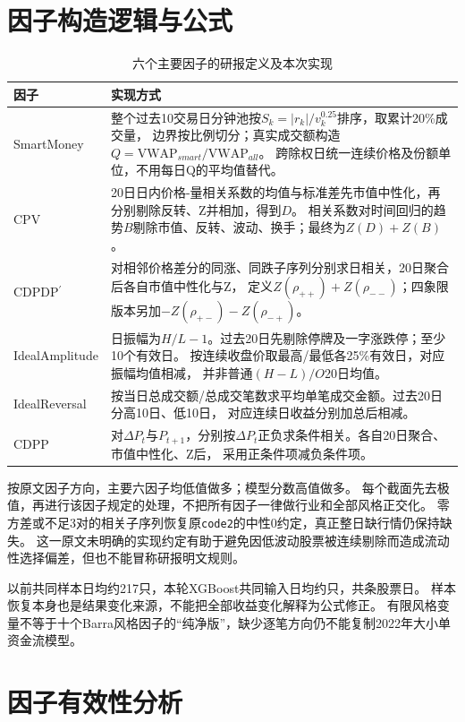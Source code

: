 \documentclass[UTF8,zihao=-4,fontset=fandol]{ctexart}
\begin{document}
\section{因子构造逻辑与公式}
\begin{table}[H]\centering\small
\caption{六个主要因子的研报定义及本次实现}
\begin{tabularx}{\linewidth}{p{28mm}X}\toprule
因子 & 实现方式\\\midrule
SmartMoney & 整个过去10交易日分钟池按$S_k=|r_k|/v_k^{0.25}$排序，取累计20\%成交量，
边界按比例切分；真实成交额构造$Q=\mathrm{VWAP}_{smart}/\mathrm{VWAP}_{all}$。
跨除权日统一连续价格及份额单位，不用每日Q的平均值替代。\\[2pt]
CPV & 20日日内价格-量相关系数的均值与标准差先市值中性化，再分别剔除反转、Z并相加，得到$D$。
相关系数对时间回归的趋势$B$剔除市值、反转、波动、换手；最终为$Z(D)+Z(B)$。\\[2pt]
CDPDP$^{\prime}$ & 对相邻价格差分的同涨、同跌子序列分别求日相关，20日聚合后各自市值中性化与Z，
定义$Z(\rho_{++})+Z(\rho_{--})$；四象限版本另加$-Z(\rho_{+-})-Z(\rho_{-+})$。\\[2pt]
IdealAmplitude & 日振幅为$H/L-1$。过去20日先剔除停牌及一字涨跌停；至少10个有效日。
按连续收盘价取最高/最低各25\%有效日，对应振幅均值相减，
并非普通$(H-L)/O$20日均值。\\[2pt]
IdealReversal & 按当日总成交额/总成交笔数求平均单笔成交金额。过去20日分高10日、低10日，
对应连续日收益分别加总后相减。\\[2pt]
CDPP & 对$\Delta P_t$与$P_{t+1}$，分别按$\Delta P_t$正负求条件相关。各自20日聚合、市值中性化、Z后，
采用正条件项减负条件项。\\\bottomrule
\end{tabularx}\end{table}

按原文因子方向，主要六因子均低值做多；模型分数高值做多。
每个截面先去极值，再进行该因子规定的处理，不把所有因子一律做行业和全部风格正交化。
零方差或不足3对的相关子序列恢复原\texttt{code2}的中性0约定，真正整日缺行情仍保持缺失。
这一原文未明确的实现约定有助于避免因低波动股票被连续剔除而造成流动性选择偏差，但也不能冒称研报明文规则。

以前共同样本日均约217只，本轮XGBoost共同输入日均约\ModelMeanStocks 只，共\ModelRows 条股票日。
样本恢复本身也是结果变化来源，不能把全部收益变化解释为公式修正。
有限风格变量不等于十个Barra风格因子的“纯净版”，缺少逐笔方向仍不能复制2022年大小单资金流模型。

\clearpage
\section{因子有效性分析}
\end{document}
